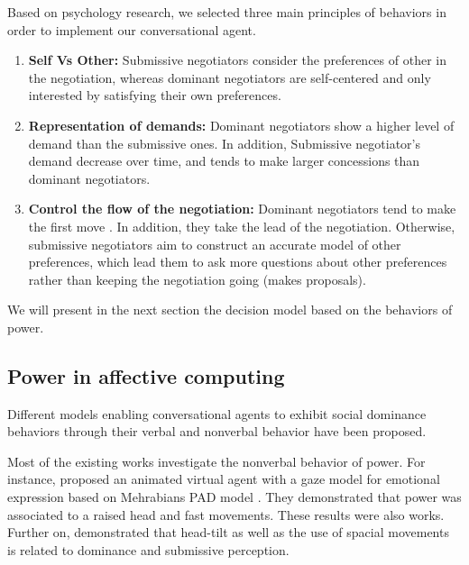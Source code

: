 \documentclass{llncs}
\begin{document}
	
	Based on psychology research, we selected three main principles of behaviors in order to implement our conversational agent.
	\begin{enumerate}
	\item \textbf{Self Vs Other:} Submissive negotiators consider the preferences of other in the negotiation, whereas dominant negotiators  are self-centered and only interested by satisfying their own preferences.
	
	\item \textbf{Representation of demands:} Dominant negotiators show a higher level of demand than the submissive ones. In addition,  Submissive negotiator's demand decrease over time, and tends to make larger concessions than dominant negotiators.
	
	\item \textbf{Control the flow of the negotiation:}
	Dominant negotiators tend to make the first move \cite{magee2007power}. In addition, they take the lead of the negotiation. Otherwise, submissive negotiators aim to construct an accurate model of other preferences, which lead them to ask more questions about other preferences rather than keeping the negotiation going (makes proposals).
	
	\end{enumerate}
		We will present in the next section the decision model based on the behaviors of power. 
	
	\subsection{Power in affective computing}
	Different models enabling conversational agents to exhibit social dominance behaviors through their verbal and nonverbal behavior have been proposed. 
	
	Most of the existing works investigate the nonverbal behavior of power. For instance, \cite{lance2008relation} proposed an animated virtual agent with a gaze model for emotional expression based on Mehrabians PAD model \cite{mehrabian1996analysis}. They demonstrated that power was associated to a raised head and fast movements. These results were also \cite{mignault2003many} works.
	 Further on, \cite{gebhard2014exploring,callejas2014computational} demonstrated that head-tilt as well as the use of spacial movements is related to dominance and submissive perception. 
	  
\end{document}
